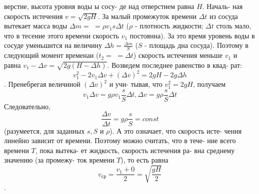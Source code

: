 \newpage
{}
\begin{minipage}[t]{0.44\textwidth}
    верстие, высота уровня воды ы сосу-\linebreak
    де над отверстием равна $H$. Началь-\linebreak
    ная скорость истечения $v=\sqrt{2gH}$.\linebreak
    За малый промежуток времени $\Delta t$ из\linebreak
    сосуда вытекает масса воды $\Delta m=$\linebreak
    $=\rho v_1s \Delta t$ ($\rho$ - плотность жидкости;\linebreak
    $\Delta t$ столь мало, что в тесение этого\linebreak
    времени скорость $v_1$ постоянна). За\linebreak
    это время уровень воды в сосуде\linebreak
    уменьшится на величину $\Delta h=\frac{\Delta m}{S}$\linebreak
    ($S$ - площадь дна сосуда). Поэтому\linebreak
    в следующий момент временаи ($t_2=$\linebreak
    $=\Delta t$) скорость истечения меньше\linebreak
    $v_1$ и равна $v_1 - \Delta v=\sqrt{2g(H-\Delta h)}$.\linebreak
    Возведем последнее равенство в квад-\linebreak
    рат:
    $$v^2_1-2v_1\Delta v+(\Delta v)^2=2gH-2g\Delta h$$.
    Пренебрегая величиной $(\Delta v)^2$ и учи-\linebreak
    тывая, что $v^2_1=2gH$, получаем
    $$v_1\Delta v=g\rho v_1\frac{s}{S}\Delta t, \Delta v=g\rho \frac{s}{S}\Delta t$$
    Следовательно,
    $$\frac{\Delta v}{\Delta t}=g\rho \frac{s}{S}=const$$
    (разумеется, для заданных $s, S$ и $\rho$).\linebreak
    А это означает, что скорость исте-\linebreak
    чения линейно зависит от времени.\linebreak
    Поэтому можно считать, что в тече-\linebreak
    ние всего времени $T$, пока вытека-\linebreak
    ет жидкость, скорость истечения ра-\linebreak
    вна среднему значению (за промежу-\linebreak
    ток времени $T$), то есть равна
    $$v_{ср}=\frac{v_1+0}{2}=\sqrt{\frac{gH}{2}}$$.

\end{minipage}
